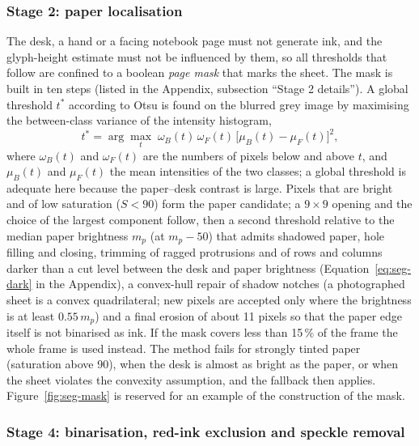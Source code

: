 \subsubsection{Stage 2: paper localisation}

The desk, a hand or a facing notebook page must not generate ink, and the glyph-height estimate must not be influenced by them, so all thresholds that follow are confined to a boolean \emph{page mask} that marks the sheet.
The mask is built in ten steps (listed in the Appendix, subsection ``Stage 2 details''). A global threshold $t^*$ according to Otsu \cite{otsu1979} is found on the blurred grey image by maximising the between-class variance of the intensity histogram,
\begin{equation}
t^*=\arg\max_t\;\omega_B(t)\,\omega_F(t)\,\bigl[\mu_B(t)-\mu_F(t)\bigr]^2,
\label{eq:seg-otsu}
\end{equation}
where $\omega_B(t)$ and $\omega_F(t)$ are the numbers of pixels below and above $t$, and $\mu_B(t)$ and $\mu_F(t)$ the mean intensities of the two classes; a global threshold is adequate here because the paper--desk contrast is large.
Pixels that are bright and of low saturation ($S<90$) form the paper candidate; a $9\times9$ opening and the choice of the largest component follow, then a second threshold relative to the median paper brightness $m_p$ (at $m_p-50$) that admits shadowed paper, hole filling and closing, trimming of ragged protrusions and of rows and columns darker than a cut level between the desk and paper brightness (Equation~\ref{eq:seg-dark} in the Appendix), a convex-hull repair of shadow notches (a photographed sheet is a convex quadrilateral; new pixels are accepted only where the brightness is at least $0.55\,m_p$) and a final erosion of about 11 pixels so that the paper edge itself is not binarised as ink.
If the mask covers less than 15\,\% of the frame the whole frame is used instead.
The method fails for strongly tinted paper (saturation above 90), when the desk is almost as bright as the paper, or when the sheet violates the convexity assumption, and the fallback then applies. Figure~\ref{fig:seg-mask} is reserved for an example of the construction of the mask.


\subsubsection{Stage 4: binarisation, red-ink exclusion and speckle removal}

